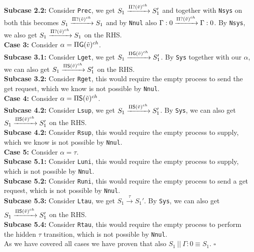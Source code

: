 \indent \indent \textbf{Subcase 2.2:} Consider \texttt{Prec}, we get $S_1\xrightarrow[]{\Pi ?(\Tilde{v})^{ch}} S_1'$ and together with \texttt{Nsys} on both this becomes $S_1\xrightarrow[]{\Pi ?(\Tilde{v})^{ch}} S_1$ and by \texttt{Nnul} also $\Gamma : 0\xrightarrow[]{\Pi ?(\Tilde{v})^{ch}} \Gamma : 0$. By \texttt{Nsys}, we also get $S_1\xrightarrow[]{\Pi ?(\Tilde{v})^{ch}} S_1$ on the RHS.\\
\indent \textbf{Case 3: } Consider $\alpha = \Pi \mathsf{G}(\Tilde{v})^{ch}$.\\
\indent \indent \textbf{Subcase 3.1: } Consider \texttt{Lget}, we get $S_1\xrightarrow[]{\Pi \mathsf{G}(\Tilde{v})^{ch}} S_1'$. By \texttt{Sys} together with our $\alpha$, we can also get $S_1\xrightarrow[]{\Pi \mathsf{S}(\Tilde{v})^{ch}} S_1'$ on the RHS.\\
\indent \indent \textbf{Subcase 3.2: } Consider \texttt{Rget}, this would require the empty process to send the get request, which we know is not possible by \texttt{Nnul}.\\
\indent \textbf{Case 4: } Consider $\alpha = \Pi \mathsf{S}(\Tilde{v})^{ch}$.\\
\indent \indent \textbf{Subcase 4.2: } Consider \texttt{Lsup}, we get $S_1\xrightarrow[]{\Pi \mathsf{S}(\Tilde{v})^{ch}} S_1'$. By \texttt{Sys}, we can also get $S_1\xrightarrow[]{\Pi \mathsf{S}(\Tilde{v})^{ch}} S_1'$ on the RHS.\\
\indent \indent \textbf{Subcase 4.2: } Consider \texttt{Rsup}, this would require the empty process to supply, which we know is not possible by \texttt{Nnul}.\\
\indent \textbf{Case 5: } Consider $\alpha = \tau$.\\
\indent \indent \textbf{Subcase 5.1: } Consider \texttt{Luni}, this would require the empty process to supply, which is not possible by \texttt{Nnul}.\\
\indent \indent \textbf{Subcase 5.2: } Consider \texttt{Runi}, this would require the empty process to send a get request, which is not possible by \texttt{Nnul}.\\
\indent \indent \textbf{Subcase 5.3: } Consider \texttt{Ltau}, we get $S_1\xrightarrow[]{\tau} S_1'$. By \texttt{Sys}, we can also get $S_1\xrightarrow[]{\Pi \mathsf{S}(\Tilde{v})^{ch}} S_1'$ on the RHS.\\
\indent \indent \textbf{Subcase 5.4: } Consider \texttt{Rtau}, this would require the empty process to perform the hidden $
\tau$ transition, which is not possible by \texttt{Nnul}.\\
As we have covered all cases we have proven that also $S_1 \ || \ \Gamma : 0 \equiv S_1$. $\square$
\\
